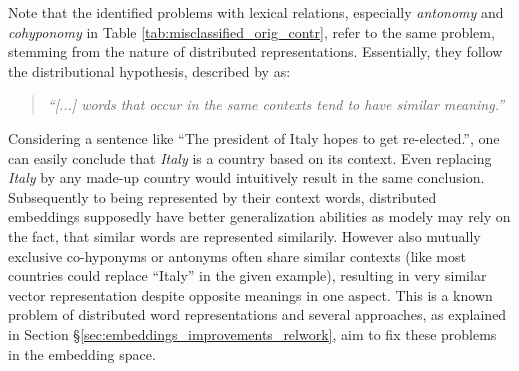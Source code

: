 \noindent
Note that the identified problems with lexical relations, especially \textit{antonomy} and \textit{cohyponomy} in Table \ref{tab:misclassified_orig_contr}, refer to the same problem, stemming from the nature of distributed representations. Essentially, they follow the distributional hypothesis, described by \cite{pantel2005inducing} as: 
\begin{quotation}
\textit{``[...] words that occur in the same contexts tend to have similar meaning.''}\citep{pantel2005inducing}
\end{quotation}
Considering a sentence like ``The president of Italy hopes to get re-elected.'', one can easily conclude that \textit{Italy} is a country based on its context. Even replacing \textit{Italy} by any made-up country would intuitively result in the same conclusion. Subsequently to being represented by their context words, distributed embeddings supposedly have better generalization abilities \citep{lecun2015deep} as modely may rely on the fact, that similar words are represented similarily. However also mutually exclusive co-hyponyms or antonyms often share similar contexts (like most countries could replace ``Italy'' in the given example), resulting in very similar vector representation despite opposite meanings in one aspect. This is a known problem \citep{sahlgren2008distributional} of distributed word representations and several approaches, as explained in Section §\ref{sec:embeddings_improvements_relwork}, aim to fix these problems in the embedding space.